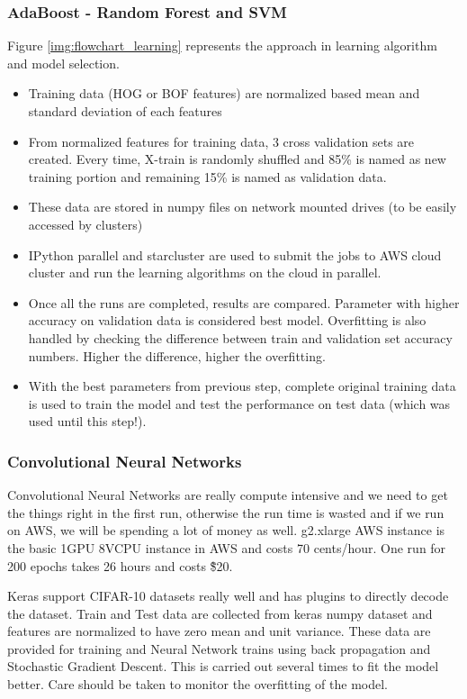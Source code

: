 \documentclass[12pt]{article}
\begin{document}
\subsubsection*{AdaBoost - Random Forest and SVM}
Figure \ref{img:flowchart_learning} represents the approach in learning algorithm and model selection. 
\begin{itemize}
\item Training data (HOG or BOF features) are normalized based mean and standard deviation of each features
\item From normalized features for training data, 3 cross validation sets are created. Every time, X-train is randomly shuffled and 85\% is named as new training portion and remaining 15\% is named as validation data. 
\item These data are stored in numpy files on network mounted drives (to be easily accessed by clusters)
\item IPython parallel and starcluster are used to submit the jobs to AWS cloud cluster and run the learning algorithms on the cloud in parallel. 
\item Once all the runs are completed, results are compared. Parameter with higher accuracy on validation data is considered best model. Overfitting is also handled by checking the difference between train and validation set accuracy numbers. Higher the difference, higher the overfitting.
\item With the best parameters from previous step, complete original training data is used to train the model and test the performance on test data (which was used until this step!).
\end{itemize}
\subsubsection*{Convolutional Neural Networks} 
Convolutional Neural Networks are really compute intensive and we need to get the things right in the first run, otherwise the run time is wasted and if we run on AWS, we will be spending a lot of money as well. g2.xlarge AWS instance is the basic 1GPU 8VCPU instance in AWS and costs 70 cents/hour. One run for 200 epochs takes 26 hours and costs \~\$20.

Keras support CIFAR-10 datasets really well and has plugins to directly decode the dataset. Train and Test data are collected from keras numpy dataset and features are normalized to have zero mean and unit variance. These data are provided for training and Neural Network trains using back propagation and Stochastic Gradient Descent. This is carried out several times to fit the model better. Care should be taken to monitor the overfitting of the model.
\end{document}

